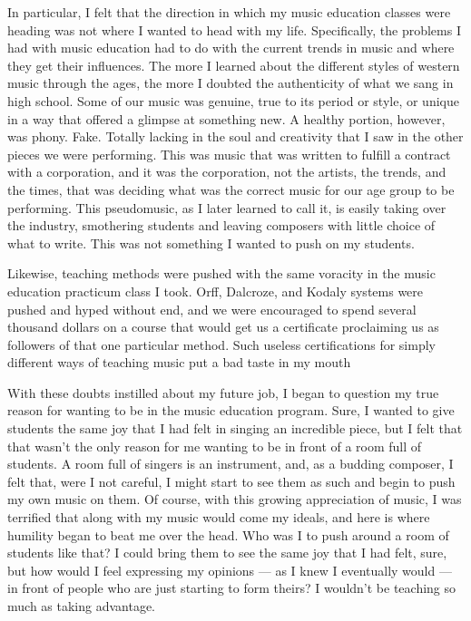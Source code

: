 \documentclass{book}
\begin{document}
In particular, I felt that the direction in which my music education classes were heading was not where I wanted to head with my life.  Specifically, the problems I had with music education had to do with the current trends in music and where they get their influences.  The more I learned about the different styles of western music through the ages, the more I doubted the authenticity of what we sang in high school.  Some of our music was genuine, true to its period or style, or unique in a way that offered a glimpse at something new.  A healthy portion, however, was phony.  Fake.  Totally lacking in the soul and creativity that I saw in the other pieces we were performing.  This was music that was written to fulfill a contract with a corporation, and it was the corporation, not the artists, the trends, and the times, that was deciding what was the correct music for our age group to be performing.  This pseudomusic, as I later learned to call it, is easily taking over the industry, smothering students and leaving composers with little choice of what to write.  This was not something I wanted to push on my students.

Likewise, teaching methods were pushed with the same voracity in the music education practicum class I took.  Orff, Dalcroze, and Kodaly systems were pushed and hyped without end, and we were encouraged to spend several thousand dollars on a course that would get us a certificate proclaiming us as followers of that one particular method.  Such useless certifications for simply different ways of teaching music put a bad taste in my mouth

With these doubts instilled about my future job, I began to question my true reason for wanting to be in the music education program.  Sure, I wanted to give students the same joy that I had felt in singing an incredible piece, but I felt that that wasn't the only reason for me wanting to be in front of a room full of students.  A room full of singers is an instrument, and, as a budding composer, I felt that, were I not careful, I might start to see them as such and begin to push my own music on them.  Of course, with this growing appreciation of music, I was terrified that along with my music would come my ideals, and here is where humility began to beat me over the head.  Who was I to push around a room of students like that? I could bring them to see the same joy that I had felt, sure, but how would I feel expressing my opinions --- as I knew I eventually would --- in front of people who are just starting to form theirs? I wouldn't be teaching so much as taking advantage.
\end{document}
